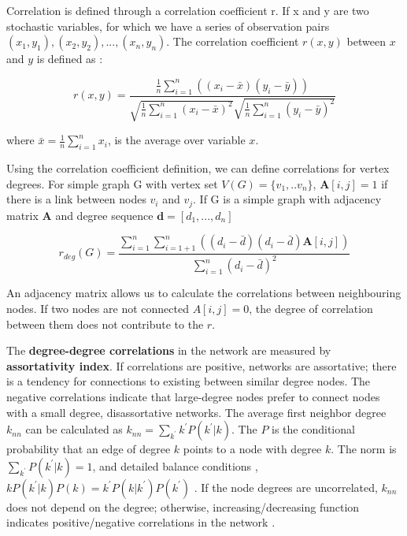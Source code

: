Correlation is defined through a correlation coefficient r. If x and y are two stochastic variables, for which we have a series of observation pairs $(x_1, y_1), (x_2, y_2), ...,(x_n, y_n)$. The correlation coefficient $r(x, y)$ between $x$ and $y$ is defined as \cite{van2010graph}:

\begin{equation}
r(x, y) = \frac{\frac{1}{n}\sum_{i=1}^{n}((x_i - \bar{x} ) (y_i - \bar{y}) )}{\sqrt{\frac{1}{n}\sum_{i=1}^{n}(x_i - \bar{x})^2} \sqrt{\frac{1}{n}\sum_{i=1}^{n}(y_i - \bar{y})^2} }
\end{equation}

where $\bar{x} = \frac{1}{n}\sum_{i=1}^{n}x_i$, is the average over variable $x$.

Using the correlation coefficient definition, we can define correlations for vertex degrees. For simple graph G with vertex set $V(G) = \{v_1, ..v_n\}$, $\boldsymbol{A}[i,j] = 1$ if there is a link between nodes $v_i$ and $v_j$. If G is a simple graph with adjacency matrix $\boldsymbol{A}$ and degree sequence $\boldsymbol{d} = [d_1, ..., d_n]$

\begin{equation}
r_{deg}(G) = \frac{\sum_{i=1}^{n}\sum_{i=1+1}^{n}((d_i - \bar{d}) (d_i - \bar{d}) \boldsymbol{A}[i,j] )}{\sum_{i=1}^{n}(d_i - \bar{d})^2}
\end{equation}

An adjacency matrix allows us to calculate the correlations between neighbouring nodes. If two nodes are not connected $A[i,j]=0$, the degree of correlation between them does not contribute to the $r$.

The \textbf{degree-degree correlations} in the network are measured by \textbf{assortativity index}. %
If correlations are positive, networks are assortative; there is a tendency for connections to existing between similar degree nodes. The negative correlations indicate that large-degree nodes prefer to connect nodes with a small degree, disassortative networks. The average first neighbor degree $k_{nn}$ can be calculated as $k_{nn} = \sum_{k^{'}}k^{'}P(k^{'}|{k})$. The $P$ is the conditional probability that an edge of degree $k$ points to a node with degree $k$. The norm is $\sum_{k^{'}}P(k^{'}|k)=1$, and detailed balance conditions \cite{boccaletti2006complex},  $kP(k^{'}|k)P(k) = k^{'}P(k|k^{'})P(k^{'})$ \cite{boccaletti2006complex}. If the node degrees are uncorrelated, $k_{nn}$ does not depend on the degree; otherwise, increasing/decreasing function indicates positive/negative correlations in the network \cite{park2003}.

